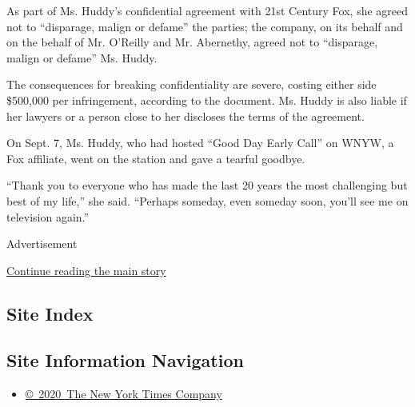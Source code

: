 As part of Ms. Huddy's confidential agreement with 21st Century Fox, she
agreed not to ``disparage, malign or defame'' the parties; the company,
on its behalf and on the behalf of Mr. O'Reilly and Mr. Abernethy,
agreed not to ``disparage, malign or defame'' Ms. Huddy.

The consequences for breaking confidentiality are severe, costing either
side \$500,000 per infringement, according to the document. Ms. Huddy is
also liable if her lawyers or a person close to her discloses the terms
of the agreement.

On Sept. 7, Ms. Huddy, who had hosted ``Good Day Early Call'' on WNYW, a
Fox affiliate, went on the station and gave a tearful goodbye.

``Thank you to everyone who has made the last 20 years the most
challenging but best of my life,'' she said. ``Perhaps someday, even
someday soon, you'll see me on television again.''

Advertisement

\protect\hyperlink{after-bottom}{Continue reading the main story}

\hypertarget{site-index}{%
\subsection{Site Index}\label{site-index}}

\hypertarget{site-information-navigation}{%
\subsection{Site Information
Navigation}\label{site-information-navigation}}

\begin{itemize}
\tightlist
\item
  \href{https://help.nytimes3xbfgragh.onion/hc/en-us/articles/115014792127-Copyright-notice}{©~2020~The
  New York Times Company}
\end{itemize}

